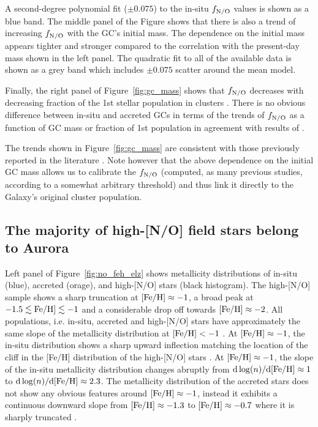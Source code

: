 \documentclass[a4paper,useAMS,usenatbib]{mnras}
\begin{document}
A second-degree polynomial fit ($\pm0.075$) to the in-situ $f_{\rm N/O}$ values is shown as a blue band. The middle panel of the Figure shows that there is also a trend of increasing $f_{\rm N/O}$ with the GC's initial mass. The dependence on the initial mass appears tighter and stronger compared to the correlation with the present-day mass shown in the left panel. The quadratic fit to all of the available data is shown as a grey band which includes $\pm0.075$ scatter around the mean model. 

Finally, the right panel of Figure~\ref{fig:gc_mass} shows that $f_{\rm N/O}$ decreases with decreasing fraction of the 1st stellar population in clusters \citep[where available, as measured by][]{Milone2017}. There is no obvious difference between in-situ and accreted GCs in terms of the trends of $f_{\rm N/O}$ as a function of GC mass or fraction of 1st population in agreement with results of \citet{Milone2020}.  

The trends shown in Figure~\ref{fig:gc_mass}  are consistent with those previously reported in the literature \citep[see e.g.][]{Bastian_Lardo2018,Gratton2019}. Note however that the above dependence on the initial GC mass allows us to calibrate the $f_{\rm N/O}$ (computed, as many previous studies, according to a somewhat arbitrary threshold) and thus link it directly to the Galaxy's original cluster population.

\subsection{The majority of high-[N/O] field stars belong to Aurora}

Left panel of Figure~\ref{fig:no_feh_elz} shows metallicity distributions of  in-situ (blue), accreted (orage), and high-[N/O] stars (black histogram). The high-[N/O] sample shows a sharp truncation at $\rm [Fe/H]\approx-1$, a broad peak at $-1.5\lesssim\rm Fe/H]\lesssim-1$ and a considerable drop off towards $\rm [Fe/H]\approx-2$. All populations, i.e. in-situ, accreted and high-[N/O] stars have approximately the same slope of the metallicity distribution at $\rm [Fe/H]<-1$ \citep[see discussion in][]{Rix2022}. At $\rm[Fe/H]\approx-1$, the in-situ distribution shows a sharp upward inflection matching the location of the cliff in the [Fe/H] distribution of the high-[N/O] stars \citep[see also Figure 4 in][]{Aurora}. At $\rm[Fe/H]\approx-1$, the slope of the in-situ metallicity distribution changes abruptly from ${\rm d} \log(n)/{\rm d[Fe/H]}\approx1$ to ${\rm d} \log(n)/{\rm d[Fe/H]}\approx2.3$. The metallicity distribution of the accreted stars does not show any obvious features around $\rm [Fe/H]\approx -1$, instead it exhibits a continuous downward slope from $\rm [Fe/H]\approx-1.3$ to $\rm [Fe/H]\approx-0.7$ where it is sharply truncated \citep[in agreement with other studies, see, e.g,][]{Belokurov2018,Mackereth2019,Splash,Feuillet2020,Sanders2021}.
\end{document}
